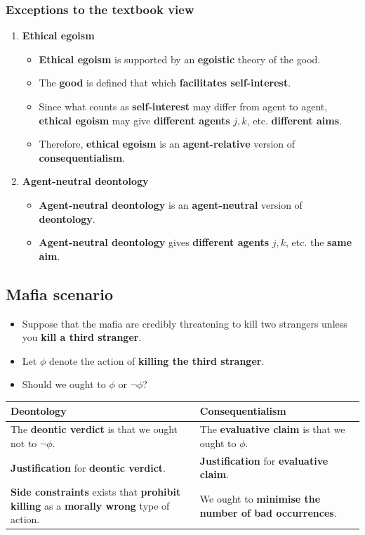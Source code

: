 \documentclass[11pt]{article}
\begin{document}
 \newpage
\subsubsection{Exceptions to the textbook view}
\label{sec:orgcc879fe}
\begin{enumerate}
\item \textbf{Ethical egoism}
\begin{itemize}
\item \textbf{Ethical egoism} is supported by an \textbf{egoistic} theory of the good.
\item The \textbf{good} is defined that which \textbf{facilitates self-interest}.
\item Since what counts as \textbf{self-interest} may differ from agent to agent, \textbf{ethical egoism} may give \textbf{different agents} \(j, k\), etc. \textbf{different aims}.
\item Therefore, \textbf{ethical egoism} is an \textbf{agent-relative} version of \textbf{consequentialism}.
\end{itemize}
\item \textbf{Agent-neutral deontology}
\begin{itemize}
\item \textbf{Agent-neutral deontology} is an \textbf{agent-neutral} version of \textbf{deontology}.
\item \textbf{Agent-neutral deontology} gives \textbf{different agents} \(j, k\), etc. the \textbf{same aim}.
\end{itemize}
\end{enumerate}
\subsection{Mafia scenario}
\label{sec:org3654d1a}
\begin{itemize}
\item Suppose that the mafia are credibly threatening to kill two strangers unless you \textbf{kill a third stranger}.
\item Let \(\phi\) denote the action of \textbf{killing the third stranger}.
\item Should we ought to \(\phi\) or \(\neg \phi\)?
\end{itemize}

\begin{center}
\begin{tabularx}{\textwidth}{|X|X|}
\hline
Deontology & Consequentialism\\
\hline
The \textbf{deontic verdict} is that we ought not to \(\neg \phi\). & The \textbf{evaluative claim} is that we ought to \(\phi\).\\
\hline
\textbf{Justification} for \textbf{deontic verdict}. & \textbf{Justification} for \textbf{evaluative claim}.\\
\textbf{Side constraints} exists that \textbf{prohibit killing} as a \textbf{morally wrong} type of action. & We ought to \textbf{minimise the number of bad occurrences}.\\
\hline
\end{tabularx}
\end{center}
\end{document}
